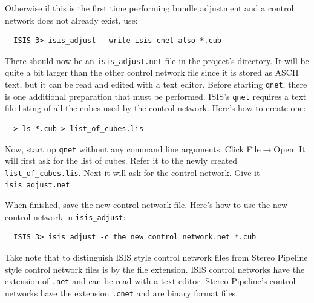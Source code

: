 Otherwise if this is the first time performing bundle adjustment and a
control network does not already exist, use:

\begin{verbatim}
  ISIS 3> isis_adjust --write-isis-cnet-also *.cub
\end{verbatim}

There should now be an \texttt{isis\_adjust.net} file in the project's
directory. It will be quite a bit larger than the other control
network file since it is stored as ASCII text, but it can be read
and edited with a text editor. Before starting \texttt{qnet}, there
is one additional preparation that must be performed. \ac{ISIS}'s
\texttt{qnet} requires a text file listing of all the cubes used
by the control network. Here's how to create one:

\begin{verbatim}
  > ls *.cub > list_of_cubes.lis
\end{verbatim}

Now, start up \texttt{qnet} without any command line arguments. Click
File$\rightarrow$Open. It will first ask for the list of cubes. Refer
it to the newly created \texttt{list\_of\_cubes.lis}. Next it will ask for
the control network. Give it \texttt{isis\_adjust.net}.

\begin{center}
\end{center}

When finished, save the new control network file. Here's how to use
the new control network in \texttt{isis\_adjust}:

\begin{verbatim}
  ISIS 3> isis_adjust -c the_new_control_network.net *.cub
\end{verbatim}

Take note that to distinguish \ac{ISIS} style control network files
from Stereo Pipeline style control network files is by the file
extension. \ac{ISIS} control networks have the extension of
\texttt{.net} and can be read with a text editor. Stereo Pipeline's
control networks have the extension \texttt{.cnet} and are binary
format files.
